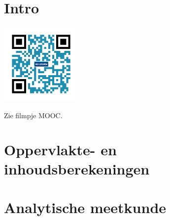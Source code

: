 
\section*{Intro}

\begin{minipage}{.25\linewidth}
	\raggedright
	\includegraphics[width=4cm]{4_opp_inhoud_an_meetk/inputs/QR_Code_INTRO_module4}
\end{minipage}
\begin{minipage}{.7\linewidth}
	Zie filmpje MOOC.
\end{minipage}

\section{Oppervlakte- en inhoudsberekeningen}



\section{Analytische meetkunde}


